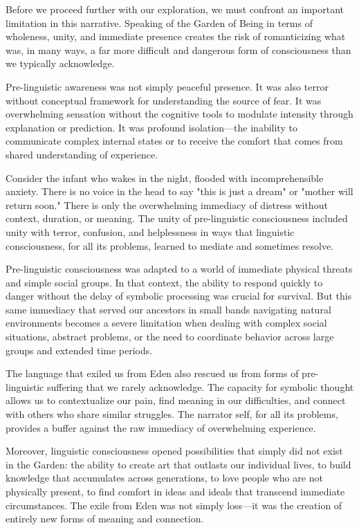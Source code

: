 Before we proceed further with our exploration, we must confront an important limitation in this narrative. Speaking of the Garden of Being in terms of wholeness, unity, and immediate presence creates the risk of romanticizing what was, in many ways, a far more difficult and dangerous form of consciousness than we typically acknowledge.

Pre-linguistic awareness was not simply peaceful presence. It was also terror without conceptual framework for understanding the source of fear. It was overwhelming sensation without the cognitive tools to modulate intensity through explanation or prediction. It was profound isolation—the inability to communicate complex internal states or to receive the comfort that comes from shared understanding of experience.

Consider the infant who wakes in the night, flooded with incomprehensible anxiety. There is no voice in the head to say "this is just a dream" or "mother will return soon." There is only the overwhelming immediacy of distress without context, duration, or meaning. The unity of pre-linguistic consciousness included unity with terror, confusion, and helplessness in ways that linguistic consciousness, for all its problems, learned to mediate and sometimes resolve.

Pre-linguistic consciousness was adapted to a world of immediate physical threats and simple social groups. In that context, the ability to respond quickly to danger without the delay of symbolic processing was crucial for survival. But this same immediacy that served our ancestors in small bands navigating natural environments becomes a severe limitation when dealing with complex social situations, abstract problems, or the need to coordinate behavior across large groups and extended time periods.

The language that exiled us from Eden also rescued us from forms of pre-linguistic suffering that we rarely acknowledge. The capacity for symbolic thought allows us to contextualize our pain, find meaning in our difficulties, and connect with others who share similar struggles. The narrator self, for all its problems, provides a buffer against the raw immediacy of overwhelming experience.

Moreover, linguistic consciousness opened possibilities that simply did not exist in the Garden: the ability to create art that outlasts our individual lives, to build knowledge that accumulates across generations, to love people who are not physically present, to find comfort in ideas and ideals that transcend immediate circumstances. The exile from Eden was not simply loss—it was the creation of entirely new forms of meaning and connection.

